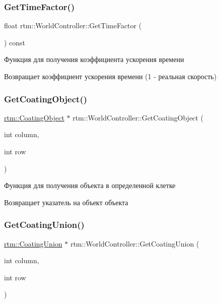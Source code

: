 \subsubsection{\texorpdfstring{Get\+Time\+Factor()}{GetTimeFactor()}}
{\footnotesize\ttfamily float rtm\+::\+World\+Controller\+::\+Get\+Time\+Factor (\begin{DoxyParamCaption}{ }\end{DoxyParamCaption}) const}

Функция для получения коэффициента ускорения времени \begin{DoxyReturn}{Возвращает}
коэффициент ускорения времени (1 -\/ реальная скорость) 
\end{DoxyReturn}
\mbox{\label{classrtm_1_1_world_controller_ab2b9d9d1451820fcbbe7107deed6e4cf}} 
\subsubsection{\texorpdfstring{Get\+Coating\+Object()}{GetCoatingObject()}}
{\footnotesize\ttfamily \hyperlink{classrtm_1_1_coating_object}{rtm\+::\+Coating\+Object} $\ast$ rtm\+::\+World\+Controller\+::\+Get\+Coating\+Object (\begin{DoxyParamCaption}\item[{int}]{column,  }\item[{int}]{row }\end{DoxyParamCaption})}

Функция для получения объекта в определенной клетке \begin{DoxyReturn}{Возвращает}
указатель на объект объекта 
\end{DoxyReturn}
\mbox{\label{classrtm_1_1_world_controller_ac43dfd6de088ba04aefc8b4d9d118ea7}} 
\subsubsection{\texorpdfstring{Get\+Coating\+Union()}{GetCoatingUnion()}}
{\footnotesize\ttfamily \hyperlink{classrtm_1_1_coating_union}{rtm\+::\+Coating\+Union} $\ast$ rtm\+::\+World\+Controller\+::\+Get\+Coating\+Union (\begin{DoxyParamCaption}\item[{int}]{column,  }\item[{int}]{row }\end{DoxyParamCaption})}

